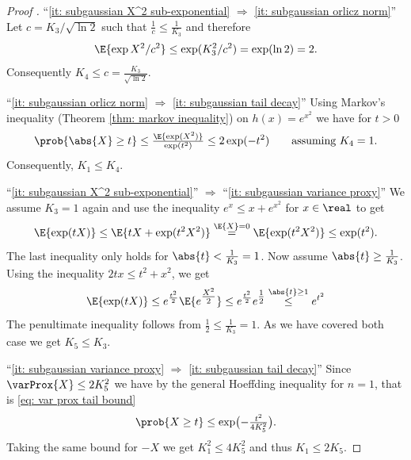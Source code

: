 \begin{proof}[Proof {\citep[Prop.~2.5.2]{vershyninHighDimensionalProbabilityIntroduction2018}}]
    ``\ref{it: subgaussian X^2 sub-exponential} \(\Rightarrow\) \ref{it: subgaussian orlicz norm}''
    Let \(c=K_3/\sqrt{\ln 2}\) such that \(\frac1c \le \frac1{K_3}\)
    and therefore
    \[
        \E{\exp{X^2/c^2}} \le \exp(K_3^2/c^2) = \exp(\ln 2) = 2.
    \]
    Consequently \(K_4 \le c= \frac{K_3}{\sqrt{\ln 2}}\).
    
    ``\ref{it: subgaussian orlicz norm} \(\Rightarrow\) \ref{it: subgaussian
    tail decay}'' Using Markov's inequality (Theorem \ref{thm: markov
    inequality}) on \(h(x) = e^{x^2}\) we have for \(t > 0\)
    \[
        \prob{\abs{X} \ge t} \le \tfrac{\E{\exp(X^2)}}{\exp(t^2)}
        \le 2 \exp(-t^2) \qquad \text{assuming } K_4 = 1.
    \]
    Consequently, \(K_1 \le K_4\).

    ``\ref{it: subgaussian X^2 sub-exponential}'' \(\Rightarrow\) ``\ref{it: subgaussian variance proxy}''
    We assume \(K_3=1\) again
    and use the inequality \(e^x \le x + e^{x^2}\) for \(x\in \real\) to get
    \[
        \E{\exp(t X)}
        \le \E{t X + \exp(t^2 X^2)}
        \overset{\E{X}=0}= \E{\exp(t^2 X^2)}
        \le \exp(t^2).
    \]
    The last inequality only holds for \(\abs{t} < \frac1{K_3} = 1\). Now assume
    \(\abs{t} \ge \frac1{K_3}\). Using the inequality \(2tx \le t^2 + x^2\), we get
    \[
        \E{\exp(t X)}
        \le e^{\frac{t^2}2}\E{e^{\tfrac{X^2}2}}
        \le e^{\frac{t^2}2} e^{\tfrac12} \overset{\abs{t}\ge 1}\le e^{t^2}
    \]
    The penultimate inequality follows from \(\frac12 \le \frac1{K_3} =1\).
    As we have covered both case we get \(K_5 \le K_3\).

    ``\ref{it: subgaussian variance proxy} \(\Rightarrow\) \ref{it: subgaussian tail decay}''
    Since \(\varProx{X} \le 2K_5^2\) we have by the general Hoeffding inequality for \(n=1\), that is \eqref{eq: var prox tail bound}
    \[
        \prob{X \ge t} \le \exp\bigl(-\tfrac{t^2}{4K_5^2}\bigr).
    \]
    Taking the same bound for \(-X\) we get \(K_1^2 \le 4K_5^2\) and thus \(K_1 \le 2 K_5\).
\end{proof}

